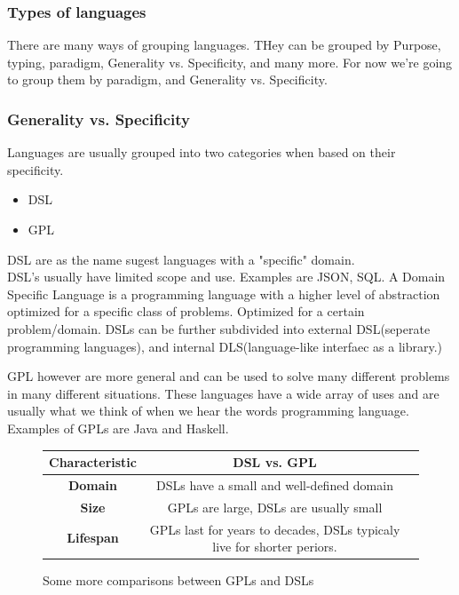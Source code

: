 \documentclass{article}
\begin{document}
        \subsubsection{Types of languages}
        There are many ways of grouping languages. THey can be grouped by Purpose, typing, paradigm, Generality vs. Specificity, and many more.
        For now we're going to group them by paradigm, and Generality vs. Specificity.
        \subsubsection*{Generality vs. Specificity}
        Languages are usually grouped into two categories when based on their specificity.
        \begin{itemize}
            \item DSL
            \item GPL
        \end{itemize}

        \Gls{DSL} are as the name sugest languages with a "specific" domain.\\
        DSL's usually have limited scope and use. Examples are JSON, SQL.     
        A Domain Specific Language is a programming language with a higher level of abstraction optimized for a specific class of problems. 
        Optimized for a certain problem/domain. 
        DSLs can be further subdivided into external DSL(seperate programming languages), and internal DLS(language-like interfaec as a library.)

        \Gls{GPL} however are more general and can be used to solve many different problems in many different situations.
        These languages have a wide array
        of uses and are usually what we think of when we hear the words programming language. Examples of GPLs are Java and Haskell.\\
        \begin{figure}[h]
            \begin{tabular}{|c|c|c}
                \hline
                \textbf{Characteristic} &\textbf{DSL vs. GPL}\\
                \hline
                \textbf{Domain} & DSLs have a small and well-defined domain\\
                \hline
                \textbf{Size} &GPLs are large, DSLs are usually small\\
                \hline
                \textbf{Lifespan} &GPLs last for years to decades, DSLs typicaly live for shorter periors.\\
                \hline
            \end{tabular}%
            \caption{Some more comparisons between GPLs and DSLs}
        \end{figure}%
\end{document}

